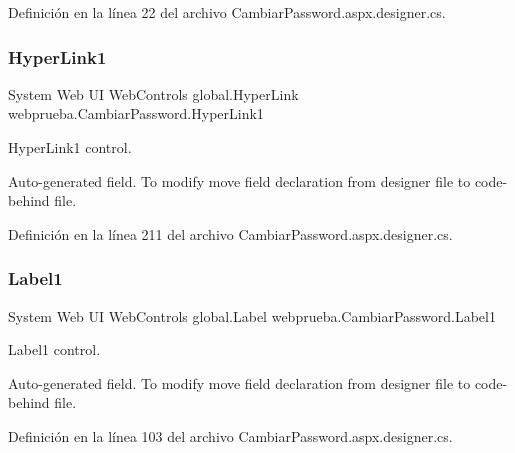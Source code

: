 Definición en la línea 22 del archivo Cambiar\+Password.\+aspx.\+designer.\+cs.

\mbox{\label{classwebprueba_1_1_cambiar_password_ab39f72218b6d0254d96d30afe73f609d}} 
\subsubsection{\texorpdfstring{HyperLink1}{HyperLink1}}
{\footnotesize\ttfamily System Web UI Web\+Controls global.\+Hyper\+Link webprueba.\+Cambiar\+Password.\+Hyper\+Link1\hspace{0.3cm}{\ttfamily [protected]}}



Hyper\+Link1 control. 

Auto-\/generated field. To modify move field declaration from designer file to code-\/behind file. 

Definición en la línea 211 del archivo Cambiar\+Password.\+aspx.\+designer.\+cs.

\mbox{\label{classwebprueba_1_1_cambiar_password_afe3f9bcf81db93a914497ee4e37124f5}} 
\subsubsection{\texorpdfstring{Label1}{Label1}}
{\footnotesize\ttfamily System Web UI Web\+Controls global.\+Label webprueba.\+Cambiar\+Password.\+Label1\hspace{0.3cm}{\ttfamily [protected]}}



Label1 control. 

Auto-\/generated field. To modify move field declaration from designer file to code-\/behind file. 

Definición en la línea 103 del archivo Cambiar\+Password.\+aspx.\+designer.\+cs.

\mbox{\label{classwebprueba_1_1_cambiar_password_a1f569bd85bd6b9f74952e02f179ce7ed}} 

